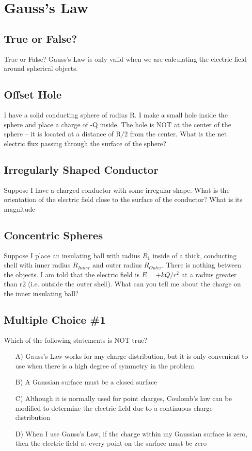 \documentclass[11pt]{article}
\begin{document}

\pagebreak
\section{Gauss's Law}

\subsection{True or False?}
True or False?  Gauss's Law is only valid when we are calculating the electric field around spherical objects.

\subsection{Offset Hole}
I have a solid conducting sphere of radius R.  I make a small hole inside the sphere and place a charge of -Q inside.  The hole is NOT at the center of the sphere – it is located at a distance of R/2 from the center.  What is the net electric flux passing through the surface of the sphere?

\subsection{Irregularly Shaped Conductor}
Suppose I have a charged conductor with some irregular shape.  What is the orientation of the electric field close to the surface of the conductor?  What is its magnitude

\subsection{Concentric Spheres}
Suppose I place an insulating ball with radius $R_1$ inside of a thick, conducting shell with inner radius $R_{Inner}$ and outer radius $R_{Outer}$.  There is nothing between the objects.  I am told that the electric field is $E = +kQ/r^2$ at a radius greater than r2 (i.e. outside the outer shell).  What can you tell me about the charge on the inner insulating ball?

\subsection{Multiple Choice \#1}
Which of the following statements is NOT true?

\begin{itemize}
 \item[A)] Gauss's Law works for any charge distribution, but it is only convenient to use when there is a high degree of symmetry in the problem
 \item[B)] A Gaussian surface must be a closed surface
 \item[C)] Although it is normally used for point charges, Coulomb's law can be modified to determine the electric field due to a continuous charge distribution
 \item[D)] When I use Gauss's Law, if the charge within my Gaussian surface is zero, then the electric field at every point on the surface must be zero
\end{itemize}
\end{document}
